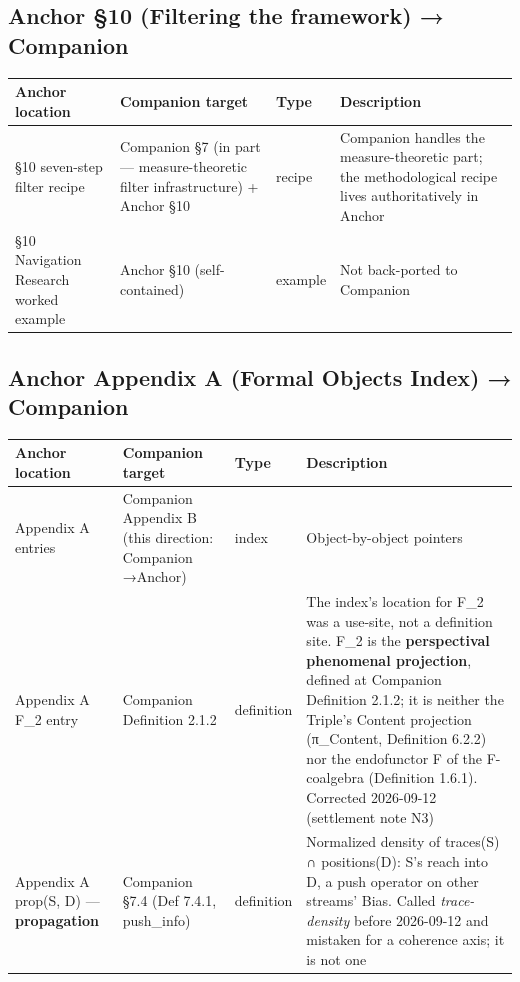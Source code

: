 \documentclass[11pt, openany]{book}
\begin{document}
\subsection{Anchor §10 (Filtering the framework) → Companion}

\begingroup\setlength{\tabcolsep}{3pt}\renewcommand{\arraystretch}{1.15}\footnotesize
\begin{center}
\begin{tabular}{p{0.65in} p{1.32in} p{0.54in} p{1.76in}}
\toprule
Anchor location & Companion target & Type & Description \\
\midrule
§10 seven-step filter recipe & Companion §7 (in part --- measure-theoretic filter infrastructure) + Anchor §10 & recipe & Companion handles the measure-theoretic part; the methodological recipe lives authoritatively in Anchor \\
§10 Navigation Research worked example & Anchor §10 (self-contained) & example & Not back-ported to Companion \\
\bottomrule
\end{tabular}
\end{center}
\endgroup
\subsection{Anchor Appendix A (Formal Objects Index) → Companion}

\begingroup\setlength{\tabcolsep}{3pt}\renewcommand{\arraystretch}{1.15}\footnotesize
\begin{center}
\begin{tabular}{p{0.51in} p{0.51in} p{0.51in} p{2.75in}}
\toprule
Anchor location & Companion target & Type & Description \\
\midrule
Appendix A entries & Companion Appendix B (this direction: Companion →\allowbreak  Anchor) & index & Object-by-object pointers \\
Appendix A F\_\allowbreak{}2 entry & Companion Definition 2.1.2 & definition & The index's location for F\_\allowbreak{}2 was a use-site, not a definition site. F\_\allowbreak{}2 is the \textbf{perspectival phenomenal projection}, defined at Companion Definition 2.1.2; it is neither the Triple's Content projection (π\_\allowbreak{}Content, Definition 6.2.2) nor the endofunctor F of the F-coalgebra (Definition 1.6.1). Corrected 2026-09-12 (settlement note N3) \\
Appendix A prop(S, D) --- \textbf{propagation} & Companion §7.4 (Def 7.4.1, push\_\allowbreak{}info) & definition & Normalized density of traces(S) ∩ positions(D): S's reach into D, a push operator on other streams' Bias. Called \textit{trace-density} before 2026-09-12 and mistaken for a coherence axis; it is not one \\
\bottomrule
\end{tabular}
\end{center}
\endgroup
\end{document}
